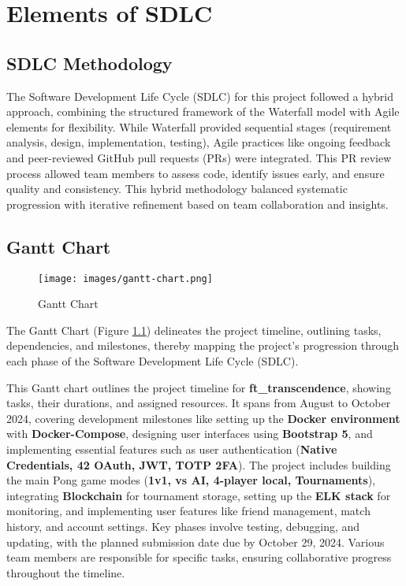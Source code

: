 \chapter{Elements of SDLC}

\section{SDLC Methodology}

The Software Development Life Cycle (SDLC) for this project followed a hybrid approach, combining the structured framework of the Waterfall model with Agile elements for flexibility. While Waterfall provided sequential stages (requirement analysis, design, implementation, testing), Agile practices like ongoing feedback and peer-reviewed GitHub pull requests (PRs) were integrated. This PR review process allowed team members to assess code, identify issues early, and ensure quality and consistency. This hybrid methodology balanced systematic progression with iterative refinement based on team collaboration and insights.

\section{Gantt Chart}

\renewcommand{\thefigure}{3.\arabic{figure}}

\begin{figure}[p]
    \centering
    \texttt{[image: images/gantt-chart.png]}
    \caption{Gantt Chart}
    \label{fig:gantt-chart}
\end{figure}


\clearpage
The Gantt Chart (Figure \ref{fig:gantt-chart}) delineates the project timeline, outlining tasks, dependencies, and milestones, thereby mapping the project's progression through each phase of the Software Development Life Cycle (SDLC).

This Gantt chart outlines the project timeline for \textbf{ft\_transcendence}, showing tasks, their durations, and assigned resources. It spans from August to October 2024, covering development milestones like setting up the \textbf{Docker environment} with \textbf{Docker-Compose}, designing user interfaces using \textbf{Bootstrap 5}, and implementing essential features such as user authentication (\textbf{Native Credentials, 42 OAuth, JWT, TOTP 2FA}). The project includes building the main Pong game modes (\textbf{1v1, vs AI, 4-player local, Tournaments}), integrating \textbf{Blockchain} for tournament storage, setting up the \textbf{ELK stack} for monitoring, and implementing user features like friend management, match history, and account settings. Key phases involve testing, debugging, and updating, with the planned submission date due by October 29, 2024. Various team members are responsible for specific tasks, ensuring collaborative progress throughout the timeline.

